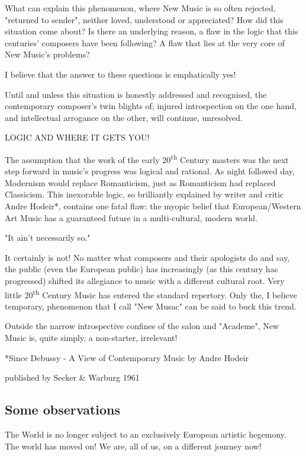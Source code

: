 \documentclass{article}
\begin{document}
What can explain this phenomenon, where New Music is so often rejected, "returned to sender", neither loved, understood or appreciated?
How did this situation come about?
Is there an underlying reason, a flaw in the logic that this centuries’ composers have been following?
A flaw that lies at the very core of New Music’s problems?

I believe that the answer to these questions is emphatically yes!

Until and unless this situation is honestly addressed and recognised, the contemporary composer’s twin blights of; injured introspection on the one hand, and intellectual arrogance on the other, will continue, unresolved.

LOGIC AND WHERE IT GETS YOU!

The assumption that the work of the early 20\textsuperscript{th} Century masters was the next step forward in music’s progress was logical and rational.
As night followed day, Modernism would replace Romanticism, just as Romanticism had replaced Classicism.
This inexorable logic, so brilliantly explained by writer and critic Andre Hodeir*, contains one fatal flaw: the myopic belief that European/Western Art Music has a guaranteed future in a multi-cultural, modern world.

"It ain’t necessarily so."

It certainly is not!
No matter what composers and their apologists do and say, the public (even the European public) has increasingly (as this century has progressed) shifted its allegiance to music with a different cultural root.
Very little 20\textsuperscript{th} Century Music has entered the standard repertory.
Only the, I believe temporary, phenomenon that I call "New Musac" can be said to buck this trend.

Outside the narrow introspective confines of  the salon and "Academe", New Music is, quite simply, a non-starter, irrelevant!

*Since Debussy - A View of Contemporary Music by Andre Hodeir

published by Secker \& Warburg 1961

\subsection{Some observations}

The World is no longer subject to an exclusively European artistic hegemony.
The world has moved on!
We are, all of us, on a different journey now!
\end{document}
